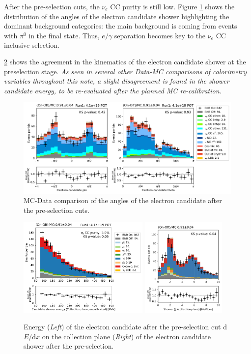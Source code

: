 After the pre-selection cuts, the $\nu_e$ CC purity is still low. Figure \ref{fig:pre_shower_E_pdg} shows the distribution of the angles of the electron candidate shower highlighting the dominant background categories: the main background is coming from events with $\pi^0$ in the final state. Thus, $e/\gamma$ separation becomes key to the $\nu_e$ CC inclusive selection.

\cref{fig:e_cand_Calo} shows the agreement in the kinematics of the electron candidate shower at the preselection stage. \emph{As seen in several other Data-MC comparisons of calorimetry variables throughout this note, a slight disagreement is found in the shower candidate energy, to be re-evaluated after the planned MC re-calibration.}


\begin{figure}[h]
    \centering
    \includegraphics[height=4.9cm]{NueCCsel/Images/run1/pre_angles.pdf}
    \caption{MC-Data comparison of the angles of the electron candidate after the pre-selection cuts.}
    \label{fig:pre_shower_E_pdg}
\end{figure}

\begin{figure}[h]
    \centering
     \includegraphics[height=4.9cm]{NueCCsel/Images/run1/pre_shower_E_pdg.pdf}
    \includegraphics[height=4.9cm]{NueCCsel/Images/run1/e_cand_dedxColl}
    \caption{ Energy (\emph{Left}) of the electron candidate after the pre-selection cut d$E$/d$x$ on the collection plane (\emph{Right}) of the electron candidate shower after the pre-selection.}
    \label{fig:e_cand_Calo}
\end{figure}


